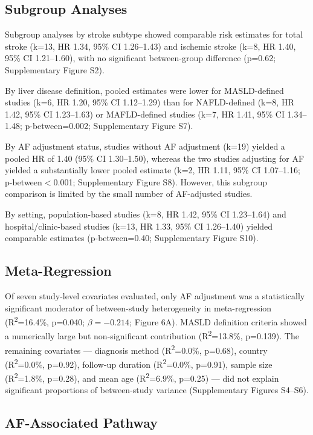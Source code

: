 \documentclass[12pt,a4paper]{article}
\begin{document}
\subsection{Subgroup Analyses}

Subgroup analyses by stroke subtype showed comparable risk estimates for total stroke (k=13, HR 1.34, 95\% CI 1.26--1.43) and ischemic stroke (k=8, HR 1.40, 95\% CI 1.21--1.60), with no significant between-group difference (p=0.62; Supplementary Figure S2).

By liver disease definition, pooled estimates were lower for MASLD-defined studies (k=6, HR 1.20, 95\% CI 1.12--1.29) than for NAFLD-defined (k=8, HR 1.42, 95\% CI 1.23--1.63) or MAFLD-defined studies (k=7, HR 1.41, 95\% CI 1.34--1.48; p-between=0.002; Supplementary Figure S7).

By AF adjustment status, studies without AF adjustment (k=19) yielded a pooled HR of 1.40 (95\% CI 1.30--1.50), whereas the two studies adjusting for AF yielded a substantially lower pooled estimate (k=2, HR 1.11, 95\% CI 1.07--1.16; p-between$<$0.001; Supplementary Figure S8). However, this subgroup comparison is limited by the small number of AF-adjusted studies.

By setting, population-based studies (k=8, HR 1.42, 95\% CI 1.23--1.64) and hospital/clinic-based studies (k=13, HR 1.33, 95\% CI 1.26--1.40) yielded comparable estimates (p-between=0.40; Supplementary Figure S10).

\subsection{Meta-Regression}

Of seven study-level covariates evaluated, only AF adjustment was a statistically significant moderator of between-study heterogeneity in meta-regression (R\textsuperscript{2}=16.4\%, p=0.040; $\beta = -0.214$; Figure 6A). MASLD definition criteria showed a numerically large but non-significant contribution (R\textsuperscript{2}=13.8\%, p=0.139). The remaining covariates — diagnosis method (R\textsuperscript{2}=0.0\%, p=0.68), country (R\textsuperscript{2}=0.0\%, p=0.92), follow-up duration (R\textsuperscript{2}=0.0\%, p=0.91), sample size (R\textsuperscript{2}=1.8\%, p=0.28), and mean age (R\textsuperscript{2}=6.9\%, p=0.25) — did not explain significant proportions of between-study variance (Supplementary Figures S4--S6).

\subsection{AF-Associated Pathway}
\end{document}
